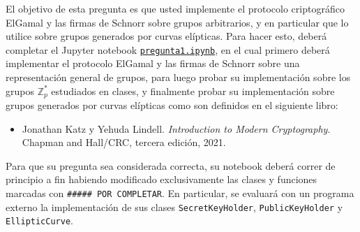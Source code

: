 
El objetivo de esta pregunta es que usted implemente el protocolo
criptográfico ElGamal y las firmas de Schnorr sobre grupos
arbitrarios, y en particular que lo utilice sobre grupos generados por
curvas elípticas. Para hacer esto, deberá completar el Jupyter
notebook
\href{https://github.com/IIC3253/2023/blob/main/tareas/tarea\%203/enunciado/questions/p1/pregunta1.ipynb}{\texttt{pregunta1.ipynb}},
en el cual primero deberá implementar el protocolo ElGamal y las
firmas de Schnorr sobre una representación general de grupos, para
luego probar su implementación sobre los grupos $\mathbb{Z}_p^*$
estudiados en clases, y finalmente probar su implementación sobre grupos
generados por curvas elípticas como son definidos en el siguiente
libro:
\begin{itemize}
  \item Jonathan Katz y Yehuda Lindell. {\em Introduction to Modern Cryptography}. Chapman and Hall/CRC, tercera edición, 2021.
\end{itemize}
Para que su pregunta sea considerada correcta, su notebook deberá
correr de principio a fin habiendo modificado exclusivamente las
clases y funciones marcadas con \texttt{\#\#\#\#\# POR COMPLETAR}. En
particular, se evaluará con un programa externo la implementación de
sus clases \texttt{SecretKeyHolder}, \texttt{PublicKeyHolder} y
\texttt{EllipticCurve}.


